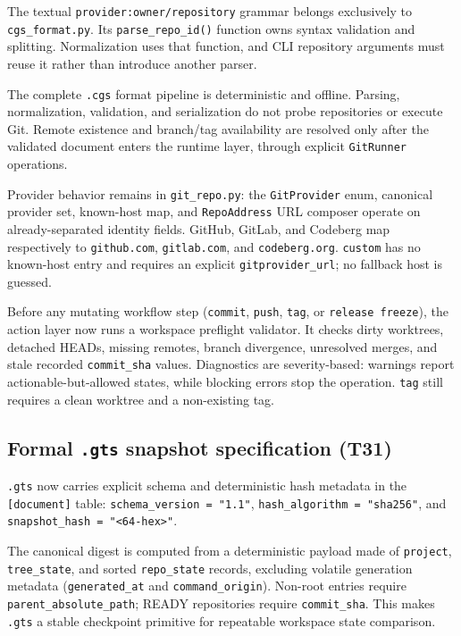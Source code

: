 The textual \texttt{provider:owner/repository} grammar belongs exclusively to
\texttt{cgs\_format.py}. Its \texttt{parse\_repo\_id()} function owns syntax validation
and splitting. Normalization uses that function, and CLI repository arguments
must reuse it rather than introduce another parser.

The complete \texttt{.cgs} format pipeline is deterministic and offline.
Parsing, normalization, validation, and serialization do not probe repositories
or execute Git. Remote existence and branch/tag availability are resolved only
after the validated document enters the runtime layer, through explicit
\texttt{GitRunner} operations.

Provider behavior remains in \texttt{git\_repo.py}: the
\texttt{GitProvider} enum, canonical provider set, known-host map, and
\texttt{RepoAddress} URL composer operate on already-separated identity
fields. GitHub, GitLab, and Codeberg map respectively to \texttt{github.com},
\texttt{gitlab.com}, and \texttt{codeberg.org}. \texttt{custom} has no
known-host entry and requires an explicit \texttt{gitprovider\_url}; no
fallback host is guessed.

Before any mutating workflow step (\texttt{commit}, \texttt{push},
\texttt{tag}, or \texttt{release freeze}), the action layer now runs a workspace
preflight validator. It checks dirty worktrees, detached HEADs, missing
remotes, branch divergence, unresolved merges, and stale recorded
\texttt{commit\_sha} values. Diagnostics are severity-based:
warnings report actionable-but-allowed states, while blocking errors stop the
operation. \texttt{tag} still requires a clean worktree and a non-existing tag.

\subsection*{Formal \texttt{.gts} snapshot specification (T31)}

\texttt{.gts} now carries explicit schema and deterministic hash metadata in the
\texttt{[document]} table:
\texttt{schema\_version = "1.1"},
\texttt{hash\_algorithm = "sha256"}, and
\texttt{snapshot\_hash = "<64-hex>"}.

The canonical digest is computed from a deterministic payload made of
\texttt{project}, \texttt{tree\_state}, and sorted \texttt{repo\_state} records,
excluding volatile generation metadata (\texttt{generated\_at} and
\texttt{command\_origin}). Non-root entries require
\texttt{parent\_absolute\_path}; READY repositories require \texttt{commit\_sha}.
This makes \texttt{.gts} a stable checkpoint primitive for repeatable workspace
state comparison.

